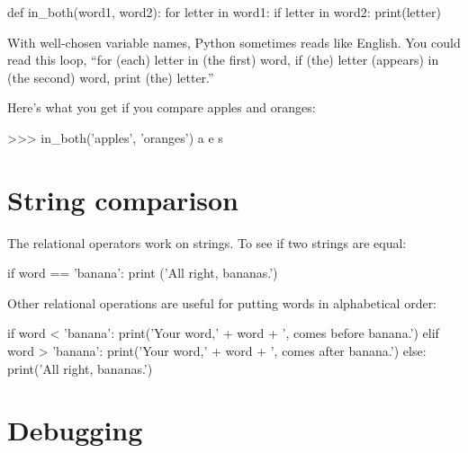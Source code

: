 \beforeverb
\begin{pycode}
def in_both(word1, word2):
    for letter in word1:
        if letter in word2:
            print(letter)
\end{pycode}
\afterverb
%
With well-chosen variable names,
Python sometimes reads like English.  You could read
this loop, ``for (each) letter in (the first) word, if (the) letter 
(appears) in (the second) word, print (the) letter.''

Here's what you get if you compare apples and oranges:

\beforeverb
\begin{pycode}
>>> in_both('apples', 'oranges')
a
e
s
\end{pycode}
\afterverb
%

\section{String comparison}


The relational operators work on strings.  To see if two strings are equal:

\beforeverb
\begin{pycode}
if word == 'banana':
    print ('All right, bananas.')
\end{pycode}
\afterverb
%
Other relational operations are useful for putting words in alphabetical
order:

\beforeverb
\begin{pycode}
if word < 'banana':
    print('Your word,' + word + ', comes before banana.')
elif word > 'banana':
    print('Your word,' + word + ', comes after banana.')
else:
    print('All right, bananas.')
\end{pycode}
\afterverb
%
%


\section{Debugging}

